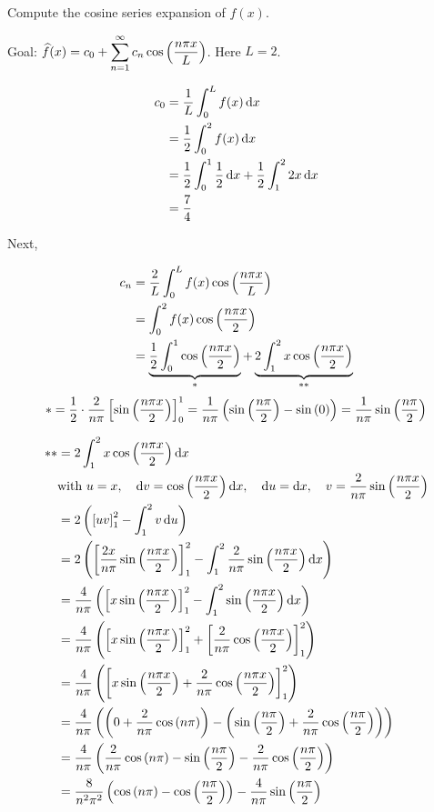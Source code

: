 Compute the cosine series expansion of $f(x)$.

\soln* Goal: $\displaystyle \widehat{f}(x) = c_0 + \sumn1 c_n \cosp{\npxl}$. Here $L = 2$. 

\begin{align*}
    c_0 &= \over{L} \intl f(x) \dd{x}\\
        &= \over{2} \int_0^2 f(x) \dd{x}\\
        &= \over{2} \int_0^1 \over2 \dd{x} + \over{2} \int_1^2 2x \dd{x}\\
        &= \frac74
\end{align*}

Next, 

\begin{align*}
    c_n &= \frac{2}{L} \intl f(x) \cosp{\npxl}\\ &= \int_0^2 f(x)  \cosp{\npxo2}\\
    &=\underbrace{\over2 \int_0^1\cosp{\npxo2}}_{\ast}  +  \underbrace{2 \int_1^2 x  \cosp{\npxo2}}_{\ast\ast}
\end{align*}
$$\ast = \frac{1}{2} \cdot \frac{2}{n \pi} \brac{\sinp{\npxo2}}_{0}^1 =
\frac{1}{n \pi}  \pars{\sinp{\frac{n \pi}{2}} - \sinp{0}} = \frac{1}{n \pi} \sinp{\frac{n \pi}{2}}$$

\begin{align*}
    ** &= 2 \int_1^2 x  \cosp{\npxo2}  \dd x\\
    & \text{with }
    u = x,\quad
    \dd v = \cosp{\npxo{2}} \dd x, \quad
    \dd u = \dd x,  \quad
    v = \onp2 \sinp{\npxo2} \\
    &= 2 \pars{\brac{uv}_1^2 - \int_1^2 v \dd{u}}\\
    &= 2 \pars{
        \brac{\onp{2x} \sinp{\npxo2}}_1^2 - \int_1^2 \onp2 \sinp{\npxo2} \dd{x}
    }\\
    &= \onp4 \pars{
        \brac{x \sinp{\npxo2}}_1^2 - \int_1^2 \sinp{\npxo2} \dd{x}
    }\\
    &= \onp4 \pars{
        \brac{x \sinp{\npxo2}}_1^2 + \brac{
            \onp2 \cosp{\npxo2}
        }_1^2
    }\\
    &= \onp4 \pars{
        \brac{x \sinp{\npxo2} + \onp2 \cosp{\npxo2}}_1^2
    }\\
    &= \onp4 \pars{
        \pars{
            0 + \onp2 \cosp{\np}
        } - \pars{
            \sinp{\npo2} + \onp2 \cosp{\npo2}
        }
    }\\
    &= \onp4 \pars{
            \onp2 \cosp{\np} -
            \sinp{\npo2} - \onp2 \cosp{\npo2}
    }\\
    &= \frac{8}{n^2 \pi^2} \pars{
        \cosp{\np} - \cosp{\npo2}
    } -
    \onp4 \sinp{\npo2}
    \\
\end{align*}

